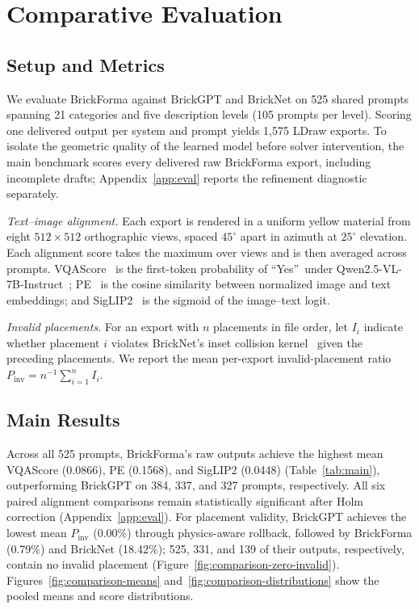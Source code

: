 \section{Comparative Evaluation}
\label{sec:eval}
\subsection{Setup and Metrics}
\label{sec:setup}
We evaluate BrickForma against BrickGPT and BrickNet on 525 shared prompts spanning 21 categories and five description levels (105 prompts per level). Scoring one delivered output per system and prompt yields 1,575 LDraw exports. To isolate the geometric quality of the learned model before solver intervention, the main benchmark scores every delivered raw BrickForma export, including incomplete drafts; Appendix~\ref{app:eval} reports the refinement diagnostic separately.

\emph{Text--image alignment.}
Each export is rendered in a uniform yellow material from eight $512{\times}512$ orthographic views, spaced $45^\circ$ apart in azimuth at $25^\circ$ elevation. Each alignment score takes the maximum over views and is then averaged across prompts. VQAScore~\cite{vqascore} is the first-token probability of \textquotedblleft Yes\textquotedblright\ under Qwen2.5-VL-7B-Instruct~\cite{qwen25vl}; PE~\cite{pe} is the cosine similarity between normalized image and text embeddings; and SigLIP2~\cite{siglip2} is the sigmoid of the image--text logit.

\emph{Invalid placements.}
For an export with $n$ placements in file order, let $I_i$ indicate whether placement $i$ violates BrickNet's inset collision kernel~\cite{bricknet} given the preceding placements. We report the mean per-export invalid-placement ratio $P_{\mathrm{inv}}=n^{-1}\sum_{i=1}^{n}I_i$.

\subsection{Main Results}

Across all 525 prompts, BrickForma's raw outputs achieve the highest mean VQAScore (0.0866), PE (0.1568), and SigLIP2 (0.0448) (Table~\ref{tab:main}), outperforming BrickGPT on 384, 337, and 327 prompts, respectively. All six paired alignment comparisons remain statistically significant after Holm correction (Appendix~\ref{app:eval}). For placement validity, BrickGPT achieves the lowest mean $P_{\mathrm{inv}}$ (0.00\%) through physics-aware rollback, followed by BrickForma (0.79\%) and BrickNet (18.42\%); 525, 331, and 139 of their outputs, respectively, contain no invalid placement (Figure~\ref{fig:comparison-zero-invalid}). Figures~\ref{fig:comparison-means} and~\ref{fig:comparison-distributions} show the pooled means and score distributions.

